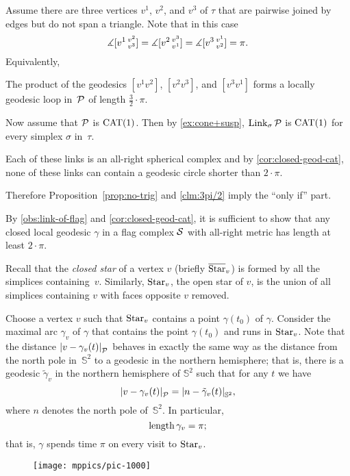 Assume there are three vertices $v^1$, $v^2$, and $v^3$ of $\tau$
that are pairwise joined by edges 
but do not span a triangle.
Note that in this case 
\[
\measuredangle[v^1\,{}^{v^2}_{v^3}]=
\measuredangle[v^2\,{}^{v^3}_{v^1}]=
\measuredangle[v^3\,{}^{v^1}_{v^2}]=
\pi.
\]
Equivalently,
\begin{clm}{}\label{clm:3pi/2}
The product
of the geodesics $[v^1v^2]$, $[v^2v^3]$, and $[v^3v^1]$
forms a locally geodesic loop in~$\mathcal{P}$ of length $\tfrac32\cdot\pi$.
\end{clm}

Now assume that $\mathcal{P}$ is $\mathrm{CAT}(1)$.
Then by \ref{ex:cone+susp},
$\mathop{\rm Link}\nolimits_\sigma\mathcal{P}$ is $\mathrm{CAT}(1)$ for every simplex $\sigma$ 
in~$\tau$. 

Each of these links is an all-right spherical complex and by \ref{cor:closed-geod-cat}, none of these links can contain a geodesic circle shorter than $2\cdot\pi$. 

Therefore Proposition~\ref{prop:no-trig} and \ref{clm:3pi/2} 
imply the ``only if'' part.

By \ref{obs:link-of-flag} and \ref{cor:closed-geod-cat},
it is sufficient to show that any closed local geodesic $\gamma$ 
in a flag complex $\mathcal{S}$ with all-right metric has length at least $2\cdot\pi$.

Recall that the  \emph{closed star} of a vertex $v$ (briefly $\overline {\mathop{\rm Star}\nolimits}_v$)
is formed by all the simplices containing~$v$. 
Similarly, $\mathop{\rm Star}\nolimits_v$, the open star of $v$, is the union of all simplices containing $v$ with faces opposite $v$ removed.

Choose a vertex $v$ such that $\mathop{\rm Star}\nolimits_v$ contains a point $\gamma(t_0)$ of $\gamma$.
Consider the maximal arc $\gamma_v$ of $\gamma$ 
that contains the point $\gamma(t_0)$
and runs in $\mathop{\rm Star}\nolimits_v$.
Note that the distance $\dist{v}{\gamma_v(t)}{\spc{P}}$ behaves in exactly the same way 
as the distance from the north pole in~$\mathbb{S}^2$ to a geodesic in the northern hemisphere;
that is, there is a geodesic $\tilde\gamma_v$ in the northern hemisphere of $\mathbb{S}^2$ such that for any $t$ we have
\[\dist{v}{\gamma_v(t)}{\spc{P}}
=
\dist{n}{\tilde\gamma_v(t)}{\mathbb{S}^2},\]
where $n$ denotes the north pole of~$\mathbb{S}^2$.
In particular, 
\[\mathop{\rm length}\nolimits\gamma_v=\pi;\]
that is, $\gamma$ spends time $\pi$ on every visit to $\mathop{\rm Star}\nolimits_v$.

\begin{wrapfigure}{r}{45mm}
\vskip-2mm
\centering
\texttt{[image: mppics/pic-1000]}
\end{wrapfigure}

